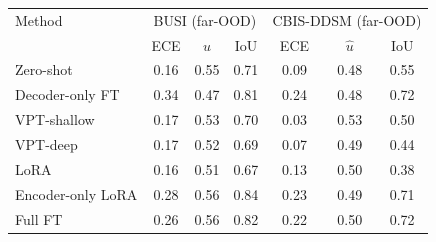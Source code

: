 \begin{tabular}{lcccccc}
\toprule
Method & \multicolumn{3}{c}{BUSI (far-OOD)} & \multicolumn{3}{c}{CBIS-DDSM (far-OOD)} \\
 & ECE & $\hat{u}$ & IoU & ECE & $\hat{u}$ & IoU \\
\midrule
Zero-shot & 0.16 & 0.55 & 0.71 & 0.09 & 0.48 & 0.55 \\
Decoder-only FT & 0.34 & 0.47 & 0.81 & 0.24 & 0.48 & 0.72 \\
VPT-shallow & 0.17 & 0.53 & 0.70 & 0.03 & 0.53 & 0.50 \\
VPT-deep & 0.17 & 0.52 & 0.69 & 0.07 & 0.49 & 0.44 \\
LoRA & 0.16 & 0.51 & 0.67 & 0.13 & 0.50 & 0.38 \\
Encoder-only LoRA & 0.28 & 0.56 & 0.84 & 0.23 & 0.49 & 0.71 \\
Full FT & 0.26 & 0.56 & 0.82 & 0.22 & 0.50 & 0.72 \\
\bottomrule
\end{tabular}

